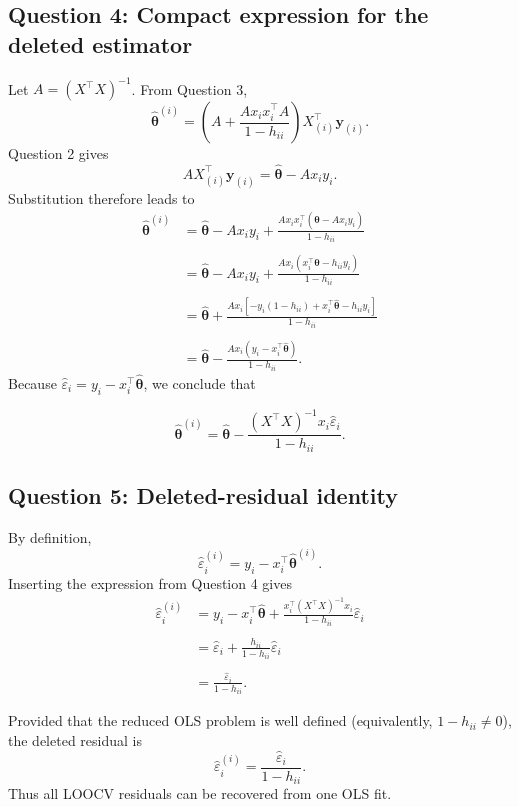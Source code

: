 \documentclass[11pt,a4paper]{article}
\newcommand{\thetahat}{\widehat{\bm\theta}}
\begin{document}
\subsection{Question 4: Compact expression for the deleted estimator}
Let $A=(X^\top X)^{-1}$. From Question 3,
\[
    \widehat{\bm\theta}^{(i)}
    =\left(A+\frac{Ax_ix_i^\top A}{1-h_{ii}}\right)
      X_{(i)}^\top\bm y_{(i)}.
\]
Question 2 gives
\[
    AX_{(i)}^\top\bm y_{(i)}=\thetahat-Ax_iy_i.
\]
Substitution therefore leads to
\begin{align*}
    \widehat{\bm\theta}^{(i)}
    &=\thetahat-Ax_iy_i
      +\frac{Ax_ix_i^\top(\thetahat-Ax_iy_i)}{1-h_{ii}} \\\\
    &=\thetahat-Ax_iy_i
      +\frac{Ax_i(x_i^\top\thetahat-h_{ii}y_i)}{1-h_{ii}} \\\\
    &=\thetahat
      +\frac{Ax_i[-y_i(1-h_{ii})+x_i^\top\thetahat-h_{ii}y_i]}
             {1-h_{ii}} \\\\
    &=\thetahat-\frac{Ax_i(y_i-x_i^\top\thetahat)}{1-h_{ii}}.
\end{align*}
Because $\widehat{\varepsilon}_i=y_i-x_i^\top\thetahat$, we conclude that
\begin{resultbox}
\[
    \boxed{
    \widehat{\bm\theta}^{(i)}
    =\thetahat-
     \frac{(X^\top X)^{-1}x_i\widehat{\varepsilon}_i}
          {1-h_{ii}}
    }.
\]
\end{resultbox}
\subsection{Question 5: Deleted-residual identity}
By definition,
\[
    \widehat{\varepsilon}^{(i)}_i
    =y_i-x_i^\top\widehat{\bm\theta}^{(i)}.
\]
Inserting the expression from Question 4 gives
\begin{align*}
    \widehat{\varepsilon}^{(i)}_i
    &=y_i-x_i^\top\thetahat
      +\frac{x_i^\top(X^\top X)^{-1}x_i}
             {1-h_{ii}}\widehat{\varepsilon}_i \\\\
    &=\widehat{\varepsilon}_i
      +\frac{h_{ii}}{1-h_{ii}}\widehat{\varepsilon}_i \\\\
    &=\frac{\widehat{\varepsilon}_i}{1-h_{ii}}.
\end{align*}
\begin{resultbox}
Provided that the reduced OLS problem is well defined (equivalently,
$1-h_{ii}\neq0$), the deleted residual is
\[
    \boxed{
    \widehat{\varepsilon}^{(i)}_i
    =\frac{\widehat{\varepsilon}_i}{1-h_{ii}}
    }.
\]
Thus all LOOCV residuals can be recovered from one OLS fit.
\end{resultbox}
\end{document}
